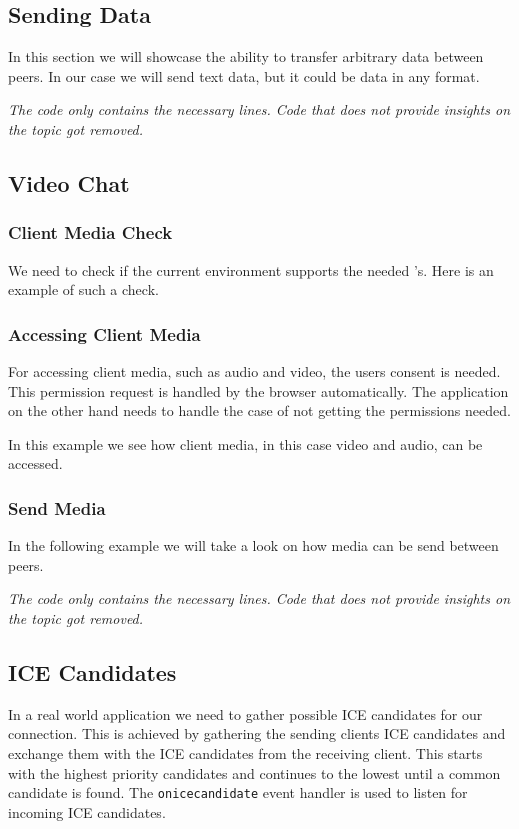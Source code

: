 \subsection{Sending Data}
In this section we will showcase the ability to transfer arbitrary data between peers. In our case we will send text data, but it could be data in any format.

\textit{The code only contains the necessary lines. Code that does not provide insights on the topic got removed.}


\subsection{Video Chat}

\subsubsection{Client Media Check}
We need to check if the current environment supports the needed 's. Here is an example of such a check.


\subsubsection{Accessing Client Media}
For accessing client media, such as audio and video, the users consent is needed. This permission request is handled by the browser automatically. The application on the other hand needs to handle the case of not getting the permissions needed.

In this example we see how client media, in this case video and audio, can be accessed.


\subsubsection{Send Media}
In the following example we will take a look on how media can be send between peers.

\textit{The code only contains the necessary lines. Code that does not provide insights on the topic got removed.}


\subsection{ICE Candidates}
In a real world application we need to gather possible ICE candidates for our connection. This is achieved by gathering the sending clients ICE candidates and exchange them with the ICE candidates from the receiving client. This starts with the highest priority candidates and continues to the lowest until a common candidate is found. The \lstinline[basicstyle=\ttfamily\color{black}]|onicecandidate| event handler is used to listen for incoming ICE candidates.